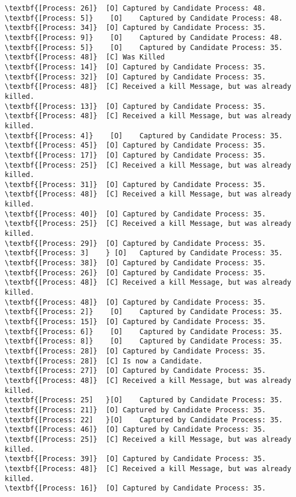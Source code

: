 \begin{Verbatim}[commandchars=\\\{\},codes={\catcode`$=3\catcode`_=8},frame=single,label=Test 6 output]
\textbf{[Process: 26]}	[O]	Captured by Candidate Process: 48.
\textbf{[Process: 5]}	 [O]	Captured by Candidate Process: 48.
\textbf{[Process: 34]}	[O]	Captured by Candidate Process: 35.
\textbf{[Process: 9]}	 [O]	Captured by Candidate Process: 48.
\textbf{[Process: 5]}	 [O]	Captured by Candidate Process: 35.
\textbf{[Process: 48]}	[C]	Was Killed
\textbf{[Process: 14]}	[O]	Captured by Candidate Process: 35.
\textbf{[Process: 32]}	[O]	Captured by Candidate Process: 35.
\textbf{[Process: 48]}	[C]	Received a kill Message, but was already killed.
\textbf{[Process: 13]}	[O]	Captured by Candidate Process: 35.
\textbf{[Process: 48]}	[C]	Received a kill Message, but was already killed.
\textbf{[Process: 4]}	 [O]	Captured by Candidate Process: 35.
\textbf{[Process: 45]}	[O]	Captured by Candidate Process: 35.
\textbf{[Process: 17]}	[O]	Captured by Candidate Process: 35.
\textbf{[Process: 25]}	[C]	Received a kill Message, but was already killed.
\textbf{[Process: 31]}	[O]	Captured by Candidate Process: 35.
\textbf{[Process: 48]}	[C]	Received a kill Message, but was already killed.
\textbf{[Process: 40]}	[O]	Captured by Candidate Process: 35.
\textbf{[Process: 25]}	[C]	Received a kill Message, but was already killed.
\textbf{[Process: 29]}	[O]	Captured by Candidate Process: 35.
\textbf{[Process: 3]	} [O]	Captured by Candidate Process: 35.
\textbf{[Process: 38]}	[O]	Captured by Candidate Process: 35.
\textbf{[Process: 26]}	[O]	Captured by Candidate Process: 35.
\textbf{[Process: 48]}	[C]	Received a kill Message, but was already killed.
\textbf{[Process: 48]}	[O]	Captured by Candidate Process: 35.
\textbf{[Process: 2]}	 [O]	Captured by Candidate Process: 35.
\textbf{[Process: 15]}	[O]	Captured by Candidate Process: 35.
\textbf{[Process: 6]}	 [O]	Captured by Candidate Process: 35.
\textbf{[Process: 8]}	 [O]	Captured by Candidate Process: 35.
\textbf{[Process: 28]}	[O]	Captured by Candidate Process: 35.
\textbf{[Process: 28]}	[C]	Is now a Candidate.
\textbf{[Process: 27]}	[O]	Captured by Candidate Process: 35.
\textbf{[Process: 48]}	[C]	Received a kill Message, but was already killed.
\textbf{[Process: 25]	}[O]	Captured by Candidate Process: 35.
\textbf{[Process: 21]}	[O]	Captured by Candidate Process: 35.
\textbf{[Process: 22]	}[O]	Captured by Candidate Process: 35.
\textbf{[Process: 46]}	[O]	Captured by Candidate Process: 35.
\textbf{[Process: 25]}	[C]	Received a kill Message, but was already killed.
\textbf{[Process: 39]}	[O]	Captured by Candidate Process: 35.
\textbf{[Process: 48]}	[C]	Received a kill Message, but was already killed.
\textbf{[Process: 16]}	[O]	Captured by Candidate Process: 35.

\end{Verbatim}
